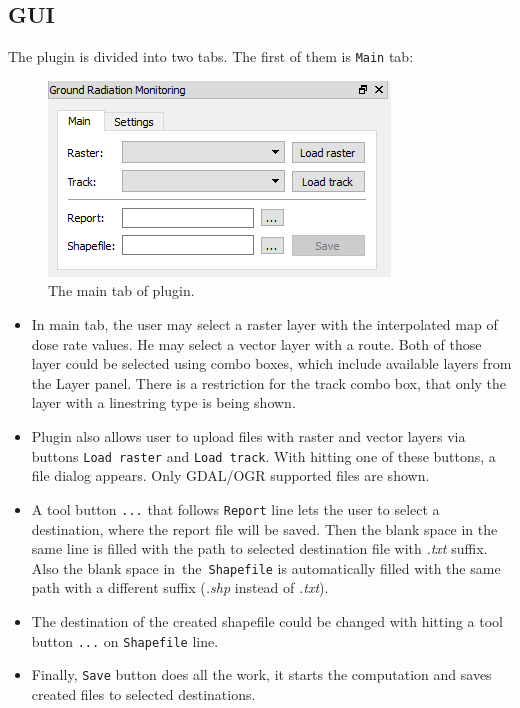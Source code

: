 \subsection{GUI}\label{gui}

The plugin is divided into two tabs. The first of them is \texttt{Main}
tab:

\begin{figure}[H]
\centering
\includegraphics{pictures/user_guide/gui_main.png}
\caption{The main tab of plugin.}
\end{figure}

\begin{itemize}

\item
  In main tab, the user may select a raster layer with the interpolated
  map of dose rate values. He may select a vector layer with a route.
  Both of those layer could be selected using combo boxes, which include
  available layers from the Layer panel. There is a restriction for the
  track combo box, that only the layer with a linestring type is being
  shown.
\item
  Plugin also allows user to upload files with raster and vector layers
  via buttons \texttt{Load\ raster} and \texttt{Load\ track}. With
  hitting one of these buttons, a file dialog appears. Only GDAL/OGR
  supported files are shown.
\item
  A tool button \texttt{...} that follows \texttt{Report} line lets the
  user to select a destination, where the report file will be saved.
  Then the blank space in the same line is filled with the path to
  selected destination file with \emph{.txt} suffix. Also the blank
  space in~the~\texttt{Shapefile} is automatically filled with the same
  path with a different suffix (\emph{.shp} instead of \emph{.txt}).
\item
  The destination of the created shapefile could be changed with hitting
  a tool button \texttt{...} on \texttt{Shapefile} line.
\item
  Finally, \texttt{Save} button does all the work, it starts the
  computation and saves created files to selected destinations.
\end{itemize}


